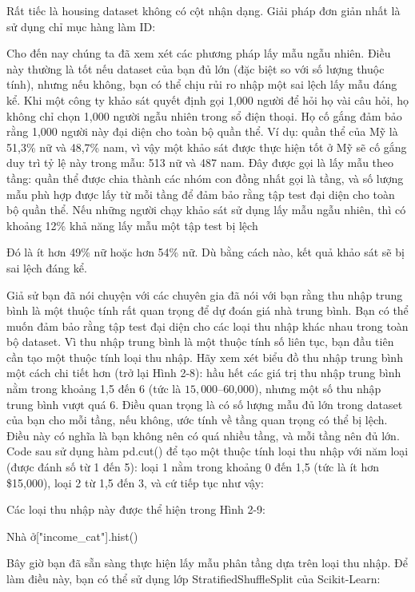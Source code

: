 Rất tiếc là housing dataset không có cột nhận dạng. Giải pháp đơn giản nhất là sử dụng chỉ mục hàng làm ID:

Cho đến nay chúng ta đã xem xét các phương pháp lấy mẫu ngẫu nhiên. Điều này thường là tốt nếu dataset của bạn đủ lớn (đặc biệt so với số lượng thuộc tính), nhưng nếu không, bạn có thể chịu rủi ro nhập một sai lệch lấy mẫu đáng kể. Khi một công ty khảo sát quyết định gọi 1,000 người để hỏi họ vài câu hỏi, họ không chỉ chọn 1,000 người ngẫu nhiên trong sổ điện thoại. Họ cố gắng đảm bảo rằng 1,000 người này đại diện cho toàn bộ quần thể. Ví dụ: quần thể của Mỹ là 51,3\% nữ và 48,7\% nam, vì vậy một khảo sát được thực hiện tốt ở Mỹ sẽ cố gắng duy trì tỷ lệ này trong mẫu: 513 nữ và 487 nam. Đây được gọi là lấy mẫu theo tầng: quần thể được chia thành các nhóm con đồng nhất gọi là tầng, và số lượng mẫu phù hợp được lấy từ mỗi tầng để đảm bảo rằng tập test đại diện cho toàn bộ quần thể. Nếu những người chạy khảo sát sử dụng lấy mẫu ngẫu nhiên, thì có khoảng 12\% khả năng lấy mẫu một tập test bị lệch

Đó là ít hơn 49\% nữ hoặc hơn 54\% nữ. Dù bằng cách nào, kết quả khảo sát sẽ bị sai lệch đáng kể.

Giả sử bạn đã nói chuyện với các chuyên gia đã nói với bạn rằng thu nhập trung bình là một thuộc tính rất quan trọng để dự đoán giá nhà trung bình. Bạn có thể muốn đảm bảo rằng tập test đại diện cho các loại thu nhập khác nhau trong toàn bộ dataset. Vì thu nhập trung bình là một thuộc tính số liên tục, bạn đầu tiên cần tạo một thuộc tính loại thu nhập. Hãy xem xét biểu đồ thu nhập trung bình một cách chi tiết hơn (trở lại Hình 2-8): hầu hết các giá trị thu nhập trung bình nằm trong khoảng 1,5 đến 6 (tức là $15,000–$60,000), nhưng một số thu nhập trung bình vượt quá 6. Điều quan trọng là có số lượng mẫu đủ lớn trong dataset của bạn cho mỗi tầng, nếu không, ước tính về tầng quan trọng có thể bị lệch. Điều này có nghĩa là bạn không nên có quá nhiều tầng, và mỗi tầng nên đủ lớn. Code sau sử dụng hàm pd.cut() để tạo một thuộc tính loại thu nhập với năm loại (được đánh số từ 1 đến 5): loại 1 nằm trong khoảng 0 đến 1,5 (tức là ít hơn \$15,000), loại 2 từ 1,5 đến 3, và cứ tiếp tục như vậy:

Các loại thu nhập này được thể hiện trong Hình 2-9:

Nhà ở["income\_cat"].hist()

Bây giờ bạn đã sẵn sàng thực hiện lấy mẫu phân tầng dựa trên loại thu nhập. Để làm điều này, bạn có thể sử dụng lớp StratifiedShuffleSplit của Scikit-Learn:


